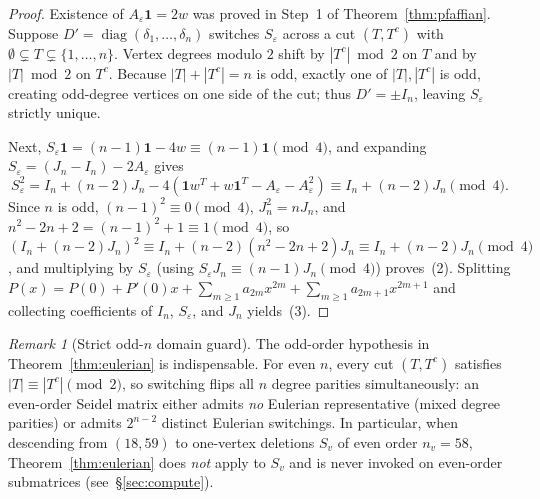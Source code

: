 \documentclass[11pt,reqno]{amsart}
\theoremstyle{definition}
\theoremstyle{remark}
\newtheorem{remark}[theorem]{Remark}
\numberwithin{equation}{section}
\numberwithin{table}{section}
\DeclareMathOperator{\diag}{diag}
\begin{document}
\begin{proof}
Existence of $A_\varepsilon \mathbf{1} = 2w$ was proved in Step~1 of Theorem~\ref{thm:pfaffian}. Suppose $D' = \diag(\delta_1, \dots, \delta_n)$ switches $S_\varepsilon$ across a cut $(T, T^c)$ with $\emptyset \subsetneq T \subsetneq \{1, \dots, n\}$. Vertex degrees modulo $2$ shift by $|T^c| \bmod 2$ on $T$ and by $|T| \bmod 2$ on $T^c$. Because $|T| + |T^c| = n$ is odd, exactly one of $|T|, |T^c|$ is odd, creating odd-degree vertices on one side of the cut; thus $D' = \pm I_n$, leaving $S_\varepsilon$ strictly unique.

Next, $S_\varepsilon \mathbf{1} = (n - 1)\mathbf{1} - 4w \equiv (n - 1)\mathbf{1} \pmod 4$, and expanding $S_\varepsilon = (J_n - I_n) - 2A_\varepsilon$ gives
\[
  S_\varepsilon^2 = I_n + (n - 2)J_n - 4(\mathbf{1}w^T + w\mathbf{1}^T - A_\varepsilon - A_\varepsilon^2) \equiv I_n + (n - 2)J_n \pmod{4}.
\]
Since $n$ is odd, $(n - 1)^2 \equiv 0 \pmod 4$, $J_n^2 = nJ_n$, and $n^2 - 2n + 2 = (n - 1)^2 + 1 \equiv 1 \pmod 4$, so $(I_n + (n-2)J_n)^2 \equiv I_n + (n-2)(n^2 - 2n + 2)J_n \equiv I_n + (n-2)J_n \pmod 4$, and multiplying by $S_\varepsilon$ (using $S_\varepsilon J_n \equiv (n-1)J_n \pmod 4$) proves~(2). Splitting $P(x) = P(0) + P'(0)x + \sum_{m \ge 1} a_{2m} x^{2m} + \sum_{m \ge 1} a_{2m+1} x^{2m+1}$ and collecting coefficients of $I_n$, $S_\varepsilon$, and $J_n$ yields~(3).
\end{proof}

\begin{remark}[Strict odd-$n$ domain guard]\label{rem:odd_guard}
The odd-order hypothesis in Theorem~\ref{thm:eulerian} is indispensable. For even $n$, every cut $(T, T^c)$ satisfies $|T| \equiv |T^c| \pmod 2$, so switching flips all $n$ degree parities simultaneously: an even-order Seidel matrix either admits \emph{no} Eulerian representative (mixed degree parities) or admits $2^{n-2}$ distinct Eulerian switchings. In particular, when descending from $(18, 59)$ to one-vertex deletions $S_v$ of even order $n_v = 58$, Theorem~\ref{thm:eulerian} does \emph{not} apply to $S_v$ and is never invoked on even-order submatrices (see~\S\ref{sec:compute}).
\end{remark}
\end{document}
